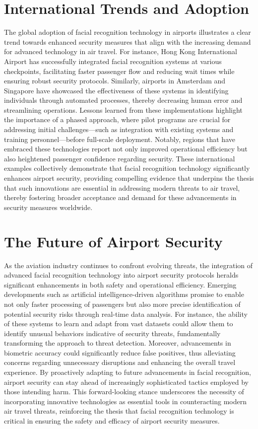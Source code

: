\documentclass{article}%
\begin{document}
%
\section*{International Trends and Adoption}%
\label{sec:InternationalTrendsandAdoption}%
The global adoption of facial recognition technology in airports illustrates a clear trend towards enhanced security measures that align with the increasing demand for advanced technology in air travel. For instance, Hong Kong International Airport has successfully integrated facial recognition systems at various checkpoints, facilitating faster passenger flow and reducing wait times while ensuring robust security protocols. Similarly, airports in Amsterdam and Singapore have showcased the effectiveness of these systems in identifying individuals through automated processes, thereby decreasing human error and streamlining operations. Lessons learned from these implementations highlight the importance of a phased approach, where pilot programs are crucial for addressing initial challenges—such as integration with existing systems and training personnel—before full{-}scale deployment. Notably, regions that have embraced these technologies report not only improved operational efficiency but also heightened passenger confidence regarding security. These international examples collectively demonstrate that facial recognition technology significantly enhances airport security, providing compelling evidence that underpins the thesis that such innovations are essential in addressing modern threats to air travel, thereby fostering broader acceptance and demand for these advancements in security measures worldwide.

%
\section*{The Future of Airport Security}%
\label{sec:TheFutureofAirportSecurity}%
As the aviation industry continues to confront evolving threats, the integration of advanced facial recognition technology into airport security protocols heralds significant enhancements in both safety and operational efficiency. Emerging developments such as artificial intelligence{-}driven algorithms promise to enable not only faster processing of passengers but also more precise identification of potential security risks through real{-}time data analysis. For instance, the ability of these systems to learn and adapt from vast datasets could allow them to identify unusual behaviors indicative of security threats, fundamentally transforming the approach to threat detection. Moreover, advancements in biometric accuracy could significantly reduce false positives, thus alleviating concerns regarding unnecessary disruptions and enhancing the overall travel experience. By proactively adapting to future advancements in facial recognition, airport security can stay ahead of increasingly sophisticated tactics employed by those intending harm. This forward{-}looking stance underscores the necessity of incorporating innovative technologies as essential tools in counteracting modern air travel threats, reinforcing the thesis that facial recognition technology is critical in ensuring the safety and efficacy of airport security measures.
\end{document}
